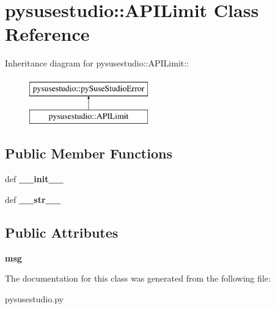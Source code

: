 \hypertarget{classpysusestudio_1_1_a_p_i_limit}{
\section{pysusestudio::APILimit Class Reference}
\label{classpysusestudio_1_1_a_p_i_limit}
}
Inheritance diagram for pysusestudio::APILimit::\begin{figure}[H]
\begin{center}
\leavevmode
\includegraphics[height=2cm]{classpysusestudio_1_1_a_p_i_limit}
\end{center}
\end{figure}
\subsection*{Public Member Functions}
\begin{DoxyCompactItemize}
\item 
\hypertarget{classpysusestudio_1_1_a_p_i_limit_a8e376dc69f87df04e6dca8a14028bd81}{
def {\bfseries \_\-\_\-init\_\-\_\-}}
\label{classpysusestudio_1_1_a_p_i_limit_a8e376dc69f87df04e6dca8a14028bd81}

\item 
\hypertarget{classpysusestudio_1_1_a_p_i_limit_ad0a553cc2380422beaeb1a1c2b000855}{
def {\bfseries \_\-\_\-str\_\-\_\-}}
\label{classpysusestudio_1_1_a_p_i_limit_ad0a553cc2380422beaeb1a1c2b000855}

\end{DoxyCompactItemize}
\subsection*{Public Attributes}
\begin{DoxyCompactItemize}
\item 
\hypertarget{classpysusestudio_1_1_a_p_i_limit_a96d8ae9a2eb1e786576b72c59079410b}{
{\bfseries msg}}
\label{classpysusestudio_1_1_a_p_i_limit_a96d8ae9a2eb1e786576b72c59079410b}

\end{DoxyCompactItemize}


The documentation for this class was generated from the following file:\begin{DoxyCompactItemize}
\item 
pysusestudio.py\end{DoxyCompactItemize}

